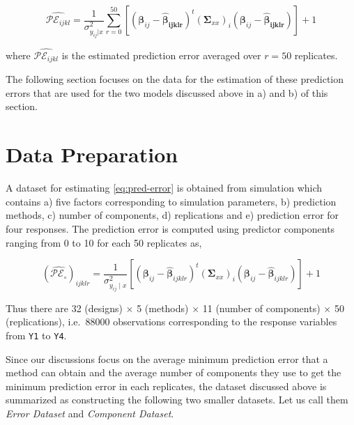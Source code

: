 \documentclass[review]{elsarticle}
\begin{document}
\begin{equation}
\widehat{\mathcal{PE}_{ijkl}} = \frac{1}{\sigma_{y_{ij}|x}^2}
  \sum_{r=0}^{50}{\left[\left(\boldsymbol{\beta}_{ij} -
  \boldsymbol{\hat{\beta}_{ijklr}}\right)^t
  \left(\boldsymbol{\Sigma}_{xx}\right)_i
  \left(\boldsymbol{\beta}_{ij} - \boldsymbol{\hat{\beta}_{ijklr}}\right)\right]} + 1
\label{eq:estimated-pred-error}
\end{equation}

where \(\widehat{\mathcal{PE}_{ijkl}}\) is the estimated prediction
error averaged over \(r=50\) replicates.

The following section focuses on the data for the estimation of these
prediction errors that are used for the two models discussed above in a)
and b) of this section.

\section{Data Preparation}\label{data-preparation}

A dataset for estimating \eqref{eq:pred-error} is obtained from simulation
which contains a) five factors corresponding to simulation parameters,
b) prediction methods, c) number of components, d) replications and e)
prediction error for four responses. The prediction error is computed
using predictor components ranging from 0 to 10 for each 50 replicates
as,

\begin{equation*}
\left(\widehat{\mathcal{PE_\circ}}\right)_{ijklr} =
  \frac{1}{\sigma_{y_{ij}\mid x}^2}\left[
    \left(\boldsymbol{\beta}_{ij} - \hat{\boldsymbol{\beta}}_{ijklr}\right)^t
    \left(\boldsymbol{\Sigma}_{xx}\right)_{i}
    \left(\boldsymbol{\beta}_{ij} - \hat{\boldsymbol{\beta}}_{ijklr}\right)
  \right] + 1
\end{equation*}

Thus there are 32 (designs) \(\times\) 5 (methods) \(\times\) 11 (number
of components) \(\times\) 50 (replications), i.e.~88000 observations
corresponding to the response variables from \texttt{Y1} to \texttt{Y4}.

Since our discussions focus on the average minimum prediction error that
a method can obtain and the average number of components they use to get
the minimum prediction error in each replicates, the dataset discussed
above is summarized as constructing the following two smaller datasets.
Let us call them \emph{Error Dataset} and \emph{Component Dataset}.
\end{document}
